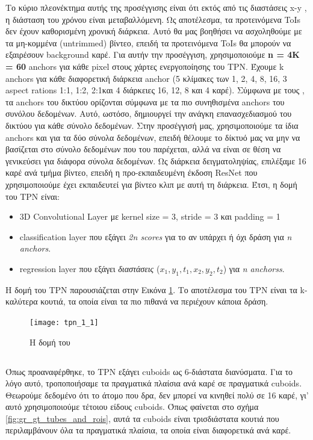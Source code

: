 Το κύριο πλεονέκτημα αυτής της προσέγγισης είναι ότι εκτός από τις διαστάσεις \en  x-y \gr , η διάσταση του χρόνου είναι μεταβαλλόμενη. Ως αποτέλεσμα, τα προτεινόμενα \en ToIs \gr
δεν έχουν καθορισμένη χρονική διάρκεια. Αυτό θα μας βοηθήσει να ασχοληθούμε με τα μη-κομμένα \en(untrimmed\gr) βίντεο, επειδή τα προτεινόμενα \en ToIs \gr  θα μπορούν να εξαιρέσουν \en background \gr
καρέ.
Για αυτήν την προσέγγιση, χρησιμοποιούμε \en\textbf{n = 4K = 60} anchors \gr  για κάθε \en  pixel \gr  στους χάρτες ενεργοποίησης του \en TPN\gr. Έχουμε \en k anchors \gr  για κάθε διαφορετική
  διάρκεια \en anchor \gr
 (5 κλίμακες των 1, 2, 4, 8, 16, 3 \en aspect rations 1:1, 1:2, 2:1\gr  και 4 διάρκειες 16, 12, 8 και 4 καρέ).
Σύμφωνα με τους \en\cite{DBLP:journals/corr/HouCS17}\gr,  τα \en anchors \gr  του δικτύου ορίζονται σύμφωνα με τα πιο συνηθισμένα \en anchors \gr  του συνόλου δεδομένων. Αυτό, ωστόσο,
δημιουργεί την ανάγκη επανασχεδιασμού του δικτύου για κάθε σύνολο δεδομένων. Στην προσέγγισή μας, χρησιμοποιούμε τα ίδια \en  anchors \gr  και για τα δύο σύνολα δεδομένων, επειδή θέλουμε το δίκτυό
μας να μην να βασίζεται στο σύνολο δεδομένων που του παρέχεται, αλλά να είναι σε θέση να γενικεύσει για διάφορα σύνολα δεδομένων. Ως διάρκεια δειγματοληψίας, επιλέξαμε 16 καρέ ανά τμήμα βίντεο, επειδή
η προ-εκπαιδευμένη έκδοση \en  ResNet \gr  που χρησιμοποιούμε έχει εκπαιδευτεί για βίντεο κλιπ με αυτή τη διάρκεια.
Έτσι, η δομή του \en  TPN \gr  είναι:
\begin{itemize}
\item{} 3D Convolutional Layer \gr με \en kernel size = 3, stride = 3 \gr  και \en padding = 1
\item{} classification layer \gr  που εξάγει \en \textit{2n scores} \gr  για το αν υπάρχει ή όχι δράση για \en\textit{n anchors}.
\item{} regression layer \gr  που εξάγει \textit{ διαστάσεις} \en ($x_1,y_1,t_1,x_2,y_2,t_2$) \gr  για \en\textit{n anchorss}.
\end{itemize}

Η δομή του \en TPN \gr  παρουσιάζεται στην Εικόνα \ref{fig:gr_tpn_1_1}. Το αποτέλεσμα του \en  TPN \gr είναι τα \en   k\gr-καλύτερα κουτιά, τα οποία
είναι τα πιο πιθανά να περιέχουν κάποια δράση.

\en
\begin{figure}[h]
  \texttt{[image: tpn\_1\_1]}
  \caption{\gr Η δομή του }
  \label{fig:gr_tpn_1_1}
\end{figure}
\gr

\subsection{}
\gr Όπως προαναφέρθηκε, το \en TPN \gr  εξάγει \en  cuboids \gr  ως 6-διάστατα διανύσματα. Για το λόγο αυτό, τροποποιήσαμε τα πραγματικά πλαίσια ανά καρέ σε πραγματικά \en  cuboids\gr.
Θεωρούμε δεδομένο ότι το άτομο που δρα, δεν μπορεί να κινηθεί πολύ σε 16 καρέ, γι' αυτό χρησιμοποιούμε τέτοιου είδους \en  cuboids\gr. Όπως φαίνεται 
στο σχήμα \ref{fig:gr_gt_tubes_and_rois}, αυτά τα \en cuboids \gr είναι τρισδιάστατα κουτιά που περιλαμβάνουν όλα τα πραγματικά πλαίσια, τα οποία είναι διαφορετικά
ανά καρέ.


